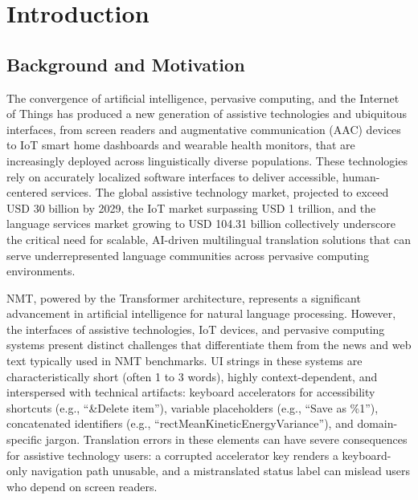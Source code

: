 \documentclass[Afour,sagev,times,doublespace]{sagej}
\begin{document}

\maketitle

\section{Introduction}

\subsection{Background and Motivation}

The convergence of artificial intelligence, pervasive computing, and the Internet of Things has produced a new generation of assistive technologies and ubiquitous interfaces, from screen readers and augmentative communication (AAC) devices to IoT smart home dashboards and wearable health monitors, that are increasingly deployed across linguistically diverse populations.\cite{1,2,3,4} These technologies rely on accurately localized software interfaces to deliver accessible, human-centered services. The global assistive technology market, projected to exceed USD 30 billion by 2029, the IoT market surpassing USD 1 trillion, and the language services market growing to USD 104.31 billion collectively underscore the critical need for scalable, AI-driven multilingual translation solutions that can serve underrepresented language communities across pervasive computing environments.

NMT, powered by the Transformer architecture,\cite{5} represents a significant advancement in artificial intelligence for natural language processing. However, the interfaces of assistive technologies, IoT devices, and pervasive computing systems present distinct challenges that differentiate them from the news and web text typically used in NMT benchmarks. UI strings in these systems are characteristically short (often 1 to 3 words), highly context-dependent, and interspersed with technical artifacts: keyboard accelerators for accessibility shortcuts (e.g., ``\&Delete item''), variable placeholders (e.g., ``Save as \%1''), concatenated identifiers (e.g., ``rectMeanKineticEnergyVariance''), and domain-specific jargon.\cite{6,7} Translation errors in these elements can have severe consequences for assistive technology users: a corrupted accelerator key renders a keyboard-only navigation path unusable, and a mistranslated status label can mislead users who depend on screen readers.
\end{document}

